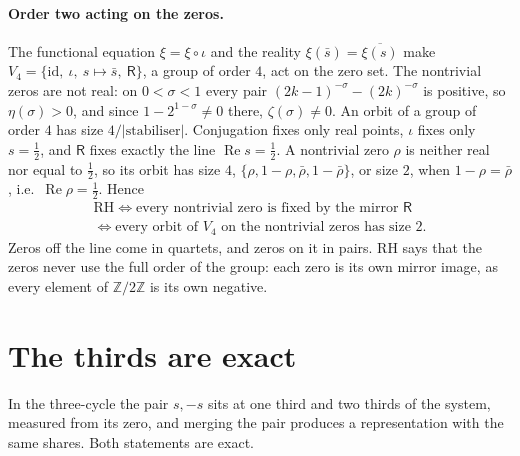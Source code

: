 \documentclass[11pt]{article}
\theoremstyle{definition}\newtheorem{definition}[theorem]{Definition}
\theoremstyle{remark}\newtheorem{remark}[theorem]{Remark}
\renewcommand{\Re}{\operatorname{Re}}\renewcommand{\Im}{\operatorname{Im}}
\begin{document}
\paragraph{Order two acting on the zeros.} The functional equation $\xi=\xi\circ\iota$ and the reality $\xi(\bar s)=\overline{\xi(s)}$ make $V_4=\{\mathrm{id},\ \iota,\ s\mapsto\bar s,\ \mathsf R\}$, a group of order $4$, act on the zero set. The nontrivial zeros are not real: on $0<\sigma<1$ every pair $(2k-1)^{-\sigma}-(2k)^{-\sigma}$ is positive, so $\eta(\sigma)>0$, and since $1-2^{1-\sigma}\ne0$ there, $\zeta(\sigma)\ne0$. An orbit of a group of order $4$ has size $4/|\mathrm{stabiliser}|$. Conjugation fixes only real points, $\iota$ fixes only $s=\tfrac12$, and $\mathsf R$ fixes exactly the line $\Re s=\frac12$. A nontrivial zero $\rho$ is neither real nor equal to $\tfrac12$, so its orbit has size $4$, $\{\rho,1-\rho,\bar\rho,1-\bar\rho\}$, or size $2$, when $1-\rho=\bar\rho$, i.e.\ $\Re\rho=\frac12$. Hence
\begin{gather*}
\text{RH}\iff\text{every nontrivial zero is fixed by the mirror }\mathsf R\\
\iff\text{every orbit of }V_4\text{ on the nontrivial zeros has size }2 .
\end{gather*}
Zeros off the line come in quartets, and zeros on it in pairs. RH says that the zeros never use the full order of the group: each zero is its own mirror image, as every element of $\mathbb Z/2\mathbb Z$ is its own negative.

\section{The thirds are exact}\label{sec:thirds}
In the three-cycle the pair $s,-s$ sits at one third and two thirds of the system, measured from its zero, and merging the pair produces a representation with the same shares. Both statements are exact.
\end{document}
